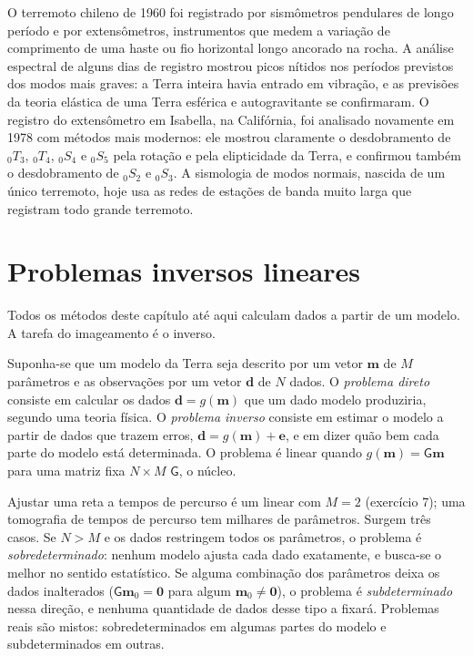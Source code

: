 \begin{history}
O terremoto chileno de 1960 foi registrado por sismômetros pendulares de longo período
e por extensômetros, instrumentos que medem a variação de comprimento de uma
haste ou fio horizontal longo ancorado na rocha. A análise espectral de alguns dias de
registro mostrou picos nítidos nos períodos previstos dos modos mais graves: a
Terra inteira havia entrado em vibração, e as previsões da teoria elástica
de uma Terra esférica e autogravitante se confirmaram. O registro do extensômetro
em Isabella, na Califórnia, foi analisado novamente em 1978 com métodos mais modernos:
ele mostrou claramente o desdobramento de ${}_0T_3$, ${}_0T_4$, ${}_0S_4$
e ${}_0S_5$ pela rotação e pela elipticidade da Terra, e confirmou também o
desdobramento de ${}_0S_2$ e ${}_0S_3$.
A sismologia de modos normais, nascida de um único terremoto, hoje usa as redes de
estações de banda muito larga que registram todo grande terremoto.
\end{history}

\section{Problemas inversos lineares}\label{sec:b3:seismology-imaging:inverse}

Todos os métodos deste capítulo até aqui calculam dados a partir de um modelo. A tarefa do
imageamento é o inverso.

\begin{definition}\label{def:b3:seismology-imaging:inverse}
Suponha-se que um modelo da Terra seja descrito por um vetor $\mathbf m$ de $M$ parâmetros
e as observações por um vetor $\mathbf d$ de $N$ dados. O \emph{problema
direto} consiste em calcular os dados $\mathbf d = g(\mathbf m)$
que um dado modelo produziria, segundo uma teoria física. O \emph{problema
inverso} consiste em estimar o modelo a partir de dados que
trazem erros, $\mathbf d = g(\mathbf m) + \mathbf e$, e em dizer quão bem cada parte
do modelo está determinada. O problema é linear quando $g(\mathbf m) =
\mathsf G\mathbf m$ para uma matriz fixa $N\times M$ $\mathsf G$, o núcleo.
\end{definition}

Ajustar uma reta a tempos de percurso é um  linear com
$M = 2$ (exercício 7); uma tomografia de tempos de percurso tem milhares de
parâmetros. Surgem três casos. Se $N > M$ e os dados restringem todos os
parâmetros, o problema é \emph{sobredeterminado}: nenhum modelo ajusta cada dado
exatamente, e busca-se o melhor no sentido estatístico. Se alguma combinação dos
parâmetros deixa os dados inalterados ($\mathsf G\mathbf m_0 = \mathbf 0$ para
algum $\mathbf m_0 \ne \mathbf 0$), o problema é \emph{subdeterminado} nessa
direção, e nenhuma quantidade de dados desse tipo a fixará. Problemas reais são
mistos: sobredeterminados em algumas partes do modelo e subdeterminados em
outras.


